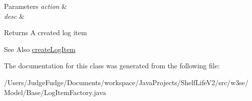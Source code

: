 \begin{DoxyParams}{Parameters}
{\em action} & \\
\hline
{\em desc} & \\
\hline
\end{DoxyParams}
\begin{DoxyReturn}{Returns}
A created log item 
\end{DoxyReturn}
\begin{DoxySeeAlso}{See Also}
\hyperlink{classw3se_1_1_model_1_1_base_1_1_log_item_factory_adfec149ab70c7e66db446d71f02c2627}{create\-Log\-Item} 
\end{DoxySeeAlso}


The documentation for this class was generated from the following file\-:\begin{DoxyCompactItemize}
\item 
/\-Users/\-Judge\-Fudge/\-Documents/workspace/\-Java\-Projects/\-Shelf\-Life\-V2/src/w3se/\-Model/\-Base/Log\-Item\-Factory.\-java\end{DoxyCompactItemize}
